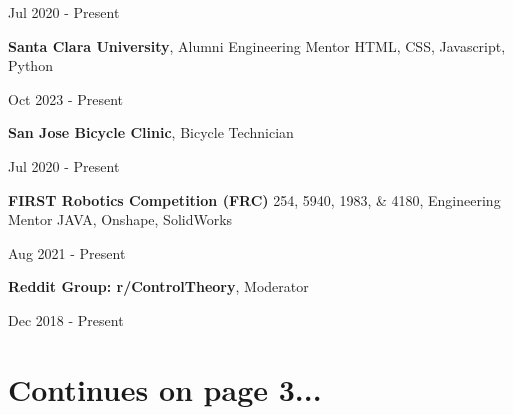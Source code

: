 \vspace{-4.5ex}
\begin{subtitle}
    Jul 2020 - Present
\end{subtitle}
\vspace{-1.5ex}

{\hspace{-1.73in}\small
\textbf{Santa Clara University}, Alumni Engineering Mentor } {\color{cyan}\small HTML, CSS, Javascript, Python}

\vspace{-4.5ex}
\begin{subtitle}
    Oct 2023 - Present
\end{subtitle}
\vspace{-1.5ex}

{\hspace{-1.73in}\small
\textbf{San Jose Bicycle Clinic}, Bicycle Technician }

\vspace{-4.5ex}
\begin{subtitle}
    Jul 2020 - Present
\end{subtitle}
\vspace{-1.5ex}

{\hspace{-1.73in}\small
\textbf{FIRST Robotics Competition (FRC)} 254, 5940, 1983, \& 4180, Engineering Mentor } {\color{cyan}\small JAVA, Onshape, SolidWorks}

\vspace{-4.5ex}
\begin{subtitle}
    Aug 2021 - Present
\end{subtitle}
\vspace{-1.5ex}

{\hspace{-1.73in}\small
\textbf{Reddit Group: r/ControlTheory}, Moderator}

\vspace{-4.5ex}
\begin{subtitle}
    Dec 2018 - Present
\end{subtitle}
\vspace{1ex}


\vspace{9ex}
\section{Continues on page 3...}{}


